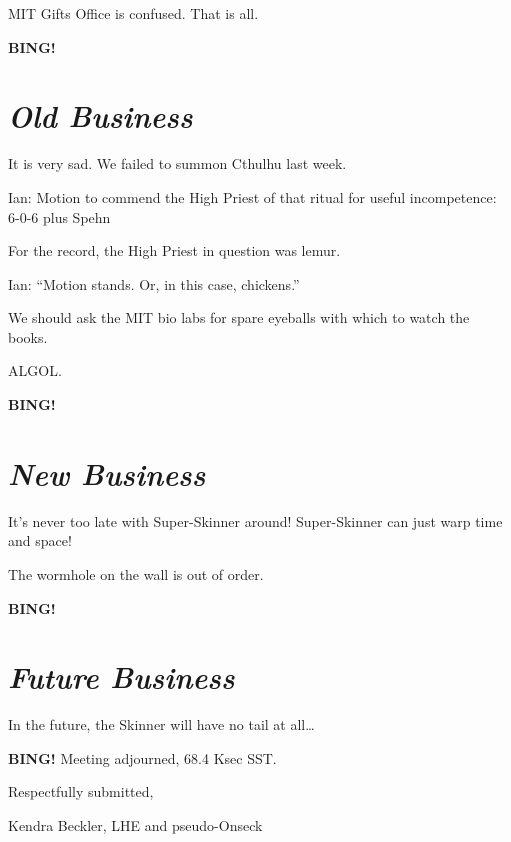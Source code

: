 \documentclass[10pt]{article}
\newcommand{\bing}{{\bf BING!} }
\newcommand{\goto}[1]{\bing \vskip 12pt \section*{{\em{#1}}}}
\newcommand{\ps}{ plus Spehn\xspace}
\newcommand{\onseck}{Kendra Beckler, LHE and pseudo-Onseck}
\begin{document}
MIT Gifts Office is confused.  That is all.

\goto{Old Business}

It is very sad.  We failed to summon Cthulhu last week.

Ian: Motion to commend the High Priest of that ritual for useful incompetence: 6-0-6 \ps

For the record, the High Priest in question was lemur.

Ian: ``Motion stands.  Or, in this case, chickens.''

We should ask the MIT bio labs for spare eyeballs with which to watch the books.

ALGOL.

\goto{New Business}

It's never too late with Super-Skinner around!  Super-Skinner can just warp time and space!

The wormhole on the wall is out of order.

\goto{Future Business}

In the future, the Skinner will have no tail at all\ldots

\bing
\noindent
Meeting adjourned, 68.4 Ksec SST.

\vspace{18pt}

\centerline{Respectfully submitted,}
\centerline{\onseck}
\end{document}
